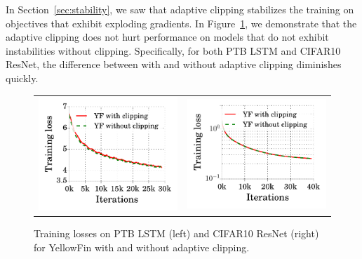 In Section~\ref{sec:stability}, we saw that adaptive clipping stabilizes the training on objectives that exhibit exploding gradients. In Figure~\ref{fig:infl_clip}, we demonstrate that the adaptive clipping does not hurt performance on models that do not exhibit instabilities without clipping. Specifically, for both PTB LSTM and CIFAR10 ResNet, the difference between \tuner with and without adaptive clipping diminishes quickly.  
\label{sec:infl_clip}
\begin{figure}
\centering
\begin{tabular}{c c}
	\includegraphics[width=0.35\linewidth]{experiment_results/ptb/clip_cmp.pdf} &
	\includegraphics[width=0.35\linewidth]{experiment_results/resnet/cifar10_clip_cmp.pdf}
\end{tabular}
\caption{Training losses on PTB LSTM (left) and CIFAR10 ResNet (right) for YellowFin with and without adaptive clipping.}
\label{fig:infl_clip}
\end{figure}
